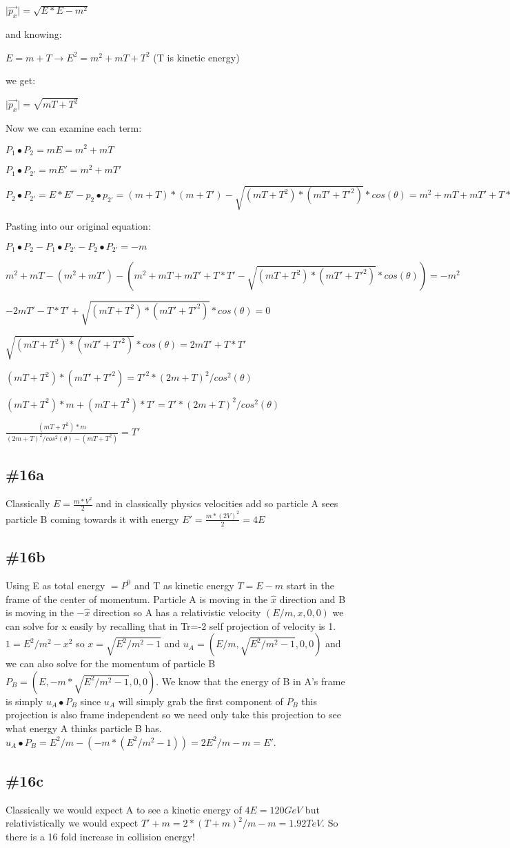 \documentclass[10pt,a4paper]{article}
\begin{document}
\(\mid\vec{p_{x}}\mid=\sqrt{E*E-m^{2}}\)

and knowing:

\(E=m+T \longrightarrow E^{2}=m^2+mT+T^2\) (T is kinetic energy)

we get:

\(\mid\vec{p_{x}}\mid=\sqrt{mT+T^2}\)

Now we can examine each term:

\(P_{1}\bullet P_{2}=mE=m^2+mT\)

\(P_{1}\bullet P_{2'}=mE'=m^2+mT'\)

\(P_{2}\bullet P_{2'}=E*E'-p_{2}\bullet p_{2'}=(m+T)*(m+T')-\sqrt{(mT+T^2)*(mT'+T'^2)}*cos(\theta)=m^2+mT+mT'+T*T'-\sqrt{(mT+T^2)*(mT'+T'^2)}*cos(\theta)\)

Pasting into our original equation:

\(P_{1}\bullet P_{2}-P_{1}\bullet P_{2'}-P_{2}\bullet P_{2'}=-m\)

\(m^2+mT-(m^2+mT')-(m^2+mT+mT'+T*T'-\sqrt{(mT+T^2)*(mT'+T'^2)}*cos(\theta))=-m^2\)

\(-2mT'-T*T'+\sqrt{(mT+T^2)*(mT'+T'^2)}*cos(\theta)=0\)

\(\sqrt{(mT+T^2)*(mT'+T'^2)}*cos(\theta)=2mT'+T*T'\)

\((mT+T^2)*(mT'+T'^2)=T'^2*(2m+T)^{2}/cos^{2}(\theta)\)

\((mT+T^2)*m+(mT+T^2)*T'=T'*(2m+T)^{2}/cos^{2}(\theta)\)

\(\frac{(mT+T^2)*m}{(2m+T)^{2}/cos^{2}(\theta)-(mT+T^2)}=T'\)

\subsection{\#16a}
Classically \(E=\frac{m*V^2}{2}\)
and in classically physics velocities add so particle A sees particle B coming towards it with energy \(E'=\frac{m*(2V)^2}{2}=4E\)

\subsection{\#16b}
Using E as total energy \(=P^{0}\) and T as kinetic energy \(T=E-m\) start in the frame of the center of momentum.  Particle A is moving in the \(\hat{x}\) direction and B is moving in the \(-\hat{x}\) direction so A has a relativistic velocity \((E/m,x,0,0)\) we can solve for x easily by recalling that in Tr=-2 self projection of velocity is 1.  \(1=E^2/m^2-x^2\) so \(x=\sqrt{E^2/m^2-1}\) and \(u_{A}=(E/m,\sqrt{E^2/m^2-1},0,0)\) and we can also solve for the momentum of particle B \(P_{B}=(E,-m*\sqrt{E^2/m^2-1},0,0)\).  We know that the energy of B in A's frame is simply \(u_{A}\bullet P_{B}\) since \(u_{A}\) will simply grab the first component of \(P_{B}\) this projection is also frame independent so we need only take this projection to see what energy A thinks particle B has.  \(u_{A}\bullet P_{B}=E^2/m-(-m*(E^2/m^2-1))=2E^2/m-m=E'\).

\subsection{\#16c}
Classically we would expect A to see a kinetic energy of \(4E=120GeV\) but relativistically we would expect \(T'+m=2*(T+m)^2/m-m=1.92TeV\).  So there is a 16 fold increase in collision energy!
\end{document}
